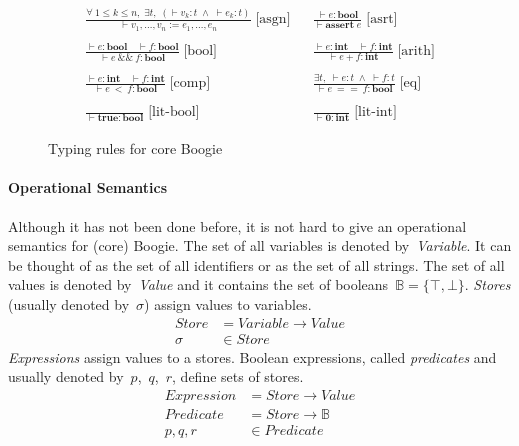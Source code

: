 \documentclass[a4paper]{article}
\newcommand{\fls}{\bot}
\newcommand{\tru}{\top}
\theoremstyle{slanted}
\theoremstyle{definition}
\theoremstyle{remark}
\begin{document}
\begin{figure}
\centering
\begin{displaymath}
\begin{array}{ccc}
  \frac
    {\forall\:  1\le k\le n,\;
      \exists t,\;  (\vdash v_k : t \;\land\;
       \vdash e_k : t)}
    { \vdash v_1,\ldots,v_n \boldsymbol{:=} e_1,\ldots,e_n}
    \;\text{[asgn]}
  &&
  \frac{\vdash e : \mathbf{bool}}{\vdash \mathbf{assert}\;e}
    \;\text{[asrt]}
  \\ \\
  \frac
    {\vdash e : \mathbf{bool} \quad \vdash f : \mathbf{bool}}
    {\vdash e \:\boldsymbol{\&\&}\: f : \mathbf{bool}}
    \;\text{[bool]}
  &&
  \frac
    {\vdash e : \mathbf{int} \quad \vdash f : \mathbf{int}}
    {\vdash e \:\boldsymbol{+}\: f : \mathbf{int}}
    \;\text{[arith]}
  \\ \\
  \frac
    {\vdash e : \mathbf{int} \quad \vdash f : \mathbf{int}}
    {\vdash e \:\boldsymbol{<}\: f : \mathbf{bool}}
    \;\text{[comp]}
  &&
  \frac
    {\exists t,\; \vdash e : t \;\land\; \vdash f : t}
    {\vdash e \:\boldsymbol{==}\: f : \mathbf{bool}}
    \;\text{[eq]}
  \\ \\
  \frac{}{\vdash\mathbf{true}:\mathbf{bool}} \;\text{[lit-bool]}
  &&
  \frac{}{\vdash\boldsymbol{0}:\mathbf{int}} \;\text{[lit-int]}
\end{array}
\end{displaymath}
\caption{Typing rules for core Boogie}\label{fig:boogie-typing}
\end{figure}

\paragraph{Operational Semantics}

Although it has not been done before, it is not hard to give an
operational semantics for (core) Boogie. The set of all variables
is denoted by~\textit{Variable}. It can be thought of as the
set of all identifiers or as the set of all strings. The set of
all values is denoted by~\textit{Value} and it contains the set
of booleans~$\mathbb{B}=\{\tru,\fls\}$. \emph{Stores} (usually
denoted by~$\sigma$) assign values to variables.
\begin{align}
\mathit{Store} &= \mathit{Variable} \to \mathit{Value} \\
\sigma &\in\mathit{Store}
\end{align}
\emph{Expressions} assign values to a stores. Boolean
expressions, called \emph{predicates} and usually denoted 
by~$p$,~$q$,~$r$, define sets of stores.
\begin{align}
\mathit{Expression} &= \mathit{Store} \to \mathit{Value} \\
\mathit{Predicate} &= \mathit{Store} \to \mathbb{B} \\
p,q,r &\in \mathit{Predicate}
\end{align}
\end{document}
